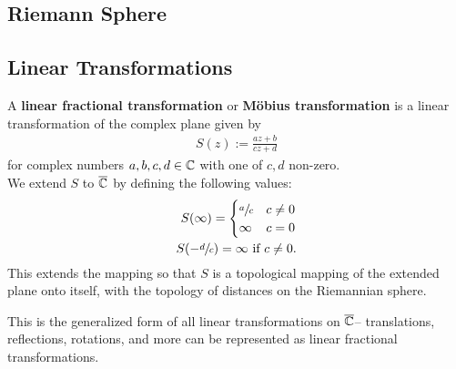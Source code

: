 \documentclass{memoir}
\begin{document}


\subsection{Riemann Sphere}
\label{sub:riemann_sphere}




\subsection{Linear Transformations}
\label{sub:linear_transformations}

\begin{defn}
	A \textbf{linear fractional transformation} or \textbf{Möbius transformation} is a linear transformation of the complex plane given by
	\begin{align*}
		S(z) := \frac{az+b}{cz+d}
	\end{align*}
	for complex numbers \(a,b,c,d \in \mathbb{C}\) with one of \(c,d\) non-zero.\\

	We extend \(S\) to \(\overline{\mathbb{C}}\) by defining the following values:
\begin{align*}
	S(\infty) = \begin{cases}
		\sfrac{a}{c} & c\neq 0\\
		\infty & c=0
	\end{cases}\\
	S(-\sfrac{d}{c}) = \infty \text{ if }c\neq 0.
\end{align*}
	This extends the mapping so that \(S\) is a topological mapping of the extended plane onto itself, with the topology of distances on the Riemannian sphere.
\end{defn}
This is the generalized form of all linear transformations on \(\overline{\mathbb{C}}\)-- translations, reflections, rotations, and more can be represented as linear fractional transformations.
\end{document}
